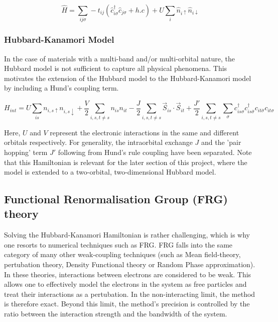 \documentclass[12pt]{article}
\begin{document}
\begin{equation}\label{t Hubbard model}
    \hat{H} = \sum_{ij\sigma} -t_{ij}(\hat{c}_{i\sigma}^{\dagger}\hat{c}_{j \sigma} + h.c) 
    + U \sum_{i} \hat{n}_{i \uparrow} \hat{n}_{i \downarrow}
\end{equation}





\subsubsection{Hubbard-Kanamori Model}
\label{subsubsec: HKmodel}
In the case of materials with a multi-band and/or multi-orbital nature, the Hubbard model is not sufficient to capture all physical phenomena. This motivates the extension of the Hubbard model to the Hubbard-Kanamori model\cite{sherman2020hubbard} by including a Hund's coupling term.

\begin{equation} \label{Hubbard-Kanamori Model}
    H_{int} = U \sum_{is}n_{i,s\uparrow}n_{i,s\downarrow} + \frac{V}{2} \sum_{i,s,t \neq s} n_{is}n_{it} -\frac{J}{2} \sum_{i,s,t \neq s} \vec{S}_{is} \cdot \vec{S}_{it} 
    + \frac{J'}{2} \sum_{i,s,t \neq s} \sum_{\sigma} c_{is\sigma}^{\dagger}c_{is\bar{\sigma}}^{\dagger}c_{it\bar{\sigma}}c_{it\sigma}
\end{equation}

\noindent Here, $U$ and $V$ represent the electronic interactions in the same and different orbitals respectively. For generality, the intraorbital exchange $J$ and the 'pair hopping' term $J'$ following from Hund's rule coupling have been separated.  
Note that this Hamiltonian is relevant for the later section of this project, where the model is extended to a two-orbital, two-dimensional Hubbard model.

\subsection{Functional Renormalisation Group (FRG) theory}

Solving the Hubbard-Kanamori Hamiltonian is rather challenging, which is why one resorts to numerical techniques such as FRG. FRG falls into the same category of many other weak-coupling techniques (such as Mean field-theory\cite{kadanoff2009more}, pertubation theory\cite{nagaosa2013quantum}, Density Functional theory\cite{kohn1965self} or Random Phase approximation\cite{bohm1951collective}).
In these theories, interactions between electrons are considered to be weak. This allows one to effectively model the electrons in the system as free particles 
and treat their interactions as a pertubation. In the non-interacting limit, the method is therefore exact. Beyond this limit, the method's precision is controlled by the ratio between the interaction
strength and the bandwidth of the system. \par
\end{document}
